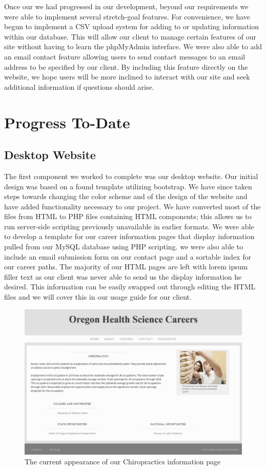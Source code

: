 \documentclass[onecolumn, draftclsnofoot,10pt, compsoc]{IEEEtran}
\begin{document}
\noindent Once our we had progressed in our development, beyond our requirements we were able to implement several stretch-goal features. For convenience, we have begun to implement a CSV upload system for adding to or updating information within our database.
This will allow our client to manage certain features of our site without having to learn the phpMyAdmin interface. We were also able to add an email contact feature allowing users to send contact messages to an email address to be specified by our client.
By including this feature directly on the website, we hope users will be more inclined to interact with our site and seek additional information if questions should arise.


\section{Progress To-Date}

\subsection{Desktop Website}

\noindent The first component we worked to complete was our desktop website. Our initial design was based on a found template utilizing bootstrap. We have since taken steps towards changing the color scheme and of the design of the website and have added functionality necessary to our project. We have converted most of the files from HTML to PHP files containing HTML components; this allows us to run server-side scripting previously unavailable in earlier formats. We were able to develop a template for our career information pages that display information pulled from our MySQL database using PHP scripting. we were also able to include an email submission form on our contact page and a sortable index for our career paths. The majority of our HTML pages are left with lorem ipsum filler text as our client was never able to send us the display information he desired. This information can be easily swapped out through editing the HTML files and we will cover this in our usage guide for our client. 

\begin{figure}[h]
\centerline{\includegraphics[scale=.3]{Figure_2.jpg} }
\caption{The current appearance of our Chiropractics information page}
\end{figure}
\end{document}
